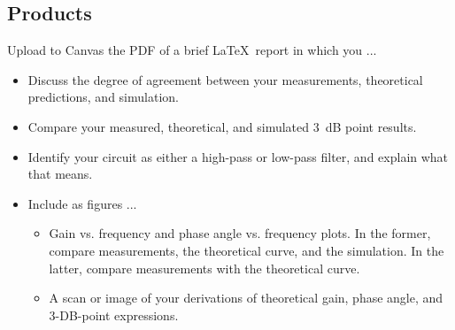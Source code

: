 \documentclass[11pt]{article}
\begin{document}
\subsection*{Products}

Upload to Canvas the PDF of a brief \LaTeX\ report in which you ...
\begin{itemize}
\item Discuss the degree of agreement between your
  measurements, theoretical predictions, and simulation.

\item Compare your measured, theoretical, and simulated 3~dB
  point results.

\item Identify your circuit as either a high-pass or low-pass
  filter, and explain what that means.

\item Include as figures ...
  \begin{itemize}
  \item Gain vs. frequency and phase angle vs. frequency plots. In the
    former, compare measurements, the theoretical curve, and the
    simulation. In the latter, compare measurements with the
    theoretical curve.

  \item A scan or image of your derivations of theoretical gain,
    phase angle, and 3-DB-point expressions. 
  \end{itemize}

\end{itemize}
\end{document}
